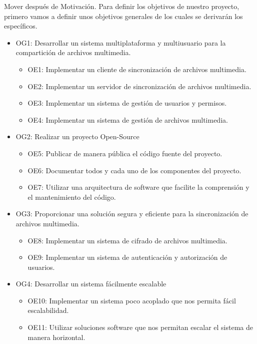 Mover después de Motivación.
Para definir los objetivos de nuestro proyecto, primero vamos a definir unos objetivos generales de los cuales se derivarán los específicos.
\begin{itemize}
    \item OG1: Desarrollar un sistema multiplataforma y multiusuario para la compartición de archivos multimedia.
        \begin{itemize}
            \item OE1: Implementar un cliente de sincronización de archivos multimedia.
            \item OE2: Implementar un servidor de sincronización de archivos multimedia.
            \item OE3: Implementar un sistema de gestión de usuarios y permisos.
            \item OE4: Implementar un sistema de gestión de archivos multimedia.
        \end{itemize}
    \item OG2: Realizar un proyecto Open-Source
        \begin{itemize}
            \item OE5: Publicar de manera pública el código fuente del proyecto.
            \item OE6: Documentar todos y cada uno de los componentes del proyecto.
            \item OE7: Utilizar una arquitectura de software que facilite la comprensión y el mantenimiento del código.
        \end{itemize}
    \item OG3: Proporcionar una solución segura y eficiente para la sincronización de archivos multimedia.
        \begin{itemize}
            \item OE8: Implementar un sistema de cifrado de archivos multimedia.
            \item OE9: Implementar un sistema de autenticación y autorización de usuarios.
        \end{itemize}
    \item OG4: Desarrollar un sistema fácilmente escalable
        \begin{itemize}
            \item OE10: Implementar un sistema poco acoplado que nos permita fácil escalabilidad.
            \item OE11: Utilizar soluciones software que nos permitan escalar el sistema de manera horizontal.

\end{itemize}
\end{itemize}
